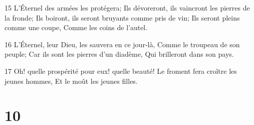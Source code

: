 \par 15 L'Éternel des armées les protégera; Ils dévoreront, ils vaincront les pierres de la fronde; Ils boiront, ils seront bruyants comme pris de vin; Ils seront pleins comme une coupe, Comme les coins de l'autel.
\par 16 L'Éternel, leur Dieu, les sauvera en ce jour-là, Comme le troupeau de son peuple; Car ils sont les pierres d'un diadème, Qui brilleront dans son pays.
\par 17 Oh! quelle prospérité pour eux! quelle beauté! Le froment fera croître les jeunes hommes, Et le moût les jeunes filles.

\chapter{10}

